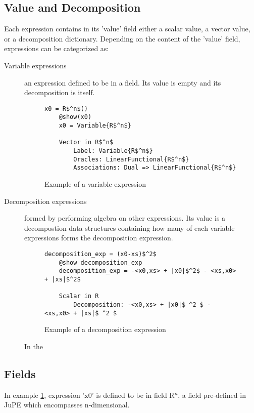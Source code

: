 \subsection*{Value and Decomposition}
Each expression contains in its 'value' field either a scalar value, a vector value, or a decomposition dictionary. Depending on the content of the 'value' field, expressions can be categorized as:
\begin{description}
	\item[Variable expressions] an expression defined to be in a field. Its value is empty and its decomposition is itself.
\begin{figure}[hbtp]
	\caption{Example of a variable expression}
	\label{ex_variable}
		\begin{lstlisting}[mathescape]
	x0 = R$^n$()
	@show(x0)
	x0 = Variable{R$^n$}

	Vector in R$^n$
		Label: Variable{R$^n$}
		Oracles: LinearFunctional{R$^n$}
		Associations: Dual => LinearFunctional{R$^n$}	
		\end{lstlisting}
\end{figure}
	\item[Decomposition expressions] formed by performing algebra on other expressions. Its value is a decompostion data structures containing how many of each variable expressions forms the decomposition expression.

\begin{figure}[hbtp]
	\caption{Example of a decomposition expression}
	\label{ex_decomposition}
		\begin{lstlisting}[mathescape]
	decomposition_exp = (x0-xs)$^2$
	@show decomposition_exp 
	decomposition_exp = -<x0,xs> + |x0|$^2$ - <xs,x0> + |xs|$^2$

	Scalar in R
		Decomposition: -<x0,xs> + |x0|$ ^2 $ - <xs,x0> + |xs|$ ^2 $
		\end{lstlisting}
\end{figure}

In the 
\end{description}

\subsection*{Fields}
In example \ref{ex_variable}, expression 'x0' is defined to be in field R$^n$, a field pre-defined in JuPE which encompasses n-dimensional.

